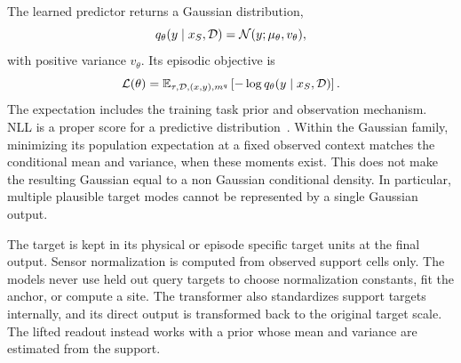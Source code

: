 The learned predictor returns a Gaussian distribution,
\[
q_\theta(y\mid x_S,\mathcal{D})=\mathcal{N}(y;\mu_\theta,v_\theta),
\]
with positive variance $v_\theta$. Its episodic objective is
\begin{equation}
  \mathcal L(\theta)
  =\mathbb E_{\tau,\mathcal{D},(x,y),m^q}
   \left[-\log q_\theta(y\mid x_S,\mathcal{D})\right].
  \label{meth:population-risk}
\end{equation}
The expectation includes the training task prior and observation mechanism. NLL is a proper score for a predictive distribution~\citep{gneiting2007scoring}. Within the Gaussian family, minimizing its population expectation at a fixed observed context matches the conditional mean and variance, when these moments exist. This does not make the resulting Gaussian equal to a non Gaussian conditional density. In particular, multiple plausible target modes cannot be represented by a single Gaussian output.

The target is kept in its physical or episode specific target units at the final output. Sensor normalization is computed from observed support cells only. The models never use held out query targets to choose normalization constants, fit the anchor, or compute a site. The transformer also standardizes support targets internally, and its direct output is transformed back to the original target scale. The lifted readout instead works with a prior whose mean and variance are estimated from the support.
